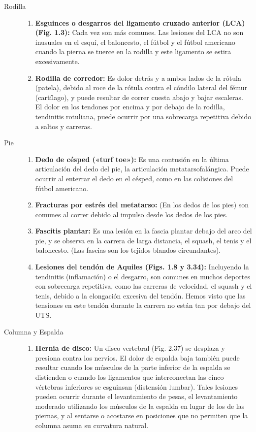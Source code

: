 \documentclass[12pt]{book}
\begin{document}
\begin{description}
  \item[Rodilla] \hfill
  \begin{enumerate}
    \item \textbf{Esguinces o desgarros del ligamento cruzado anterior (LCA) (Fig. 1.3):} Cada vez son más comunes. Las lesiones del LCA no son inusuales en el esquí, el baloncesto, el fútbol y el fútbol americano cuando la pierna se tuerce en la rodilla y este ligamento se estira excesivamente.
    \item \textbf{Rodilla de corredor:} Es dolor detrás y a ambos lados de la rótula (patela), debido al roce de la rótula contra el cóndilo lateral del fémur (cartílago), y puede resultar de correr cuesta abajo y bajar escaleras. El dolor en los tendones por encima y por debajo de la rodilla, tendinitis rotuliana, puede ocurrir por una sobrecarga repetitiva debido a saltos y carreras.
  \end{enumerate}

  \item[Pie] \hfill
  \begin{enumerate}
    \item \textbf{Dedo de césped («turf toe»):} Es una contusión en la última articulación del dedo del pie, la articulación metatarsofalángica. Puede ocurrir al enterrar el dedo en el césped, como en las colisiones del fútbol americano.
    \item \textbf{Fracturas por estrés del metatarso:} (En los dedos de los pies) son comunes al correr debido al impulso desde los dedos de los pies.
    \item \textbf{Fascitis plantar:} Es una lesión en la fascia plantar debajo del arco del pie, y se observa en la carrera de larga distancia, el squash, el tenis y el baloncesto. (Las fascias son los tejidos blandos circundantes).
    \item \textbf{Lesiones del tendón de Aquiles (Figs. 1.8 y 3.34):} Incluyendo la tendinitis (inflamación) o el desgarro, son comunes en muchos deportes con sobrecarga repetitiva, como las carreras de velocidad, el squash y el tenis, debido a la elongación excesiva del tendón. Hemos visto que las tensiones en este tendón durante la carrera no están tan por debajo del $\text{UTS}$.
  \end{enumerate}

  \item[Columna y Espalda] \hfill
  \begin{enumerate}
    \item \textbf{Hernia de disco:} Un disco vertebral (Fig. 2.37) se desplaza y presiona contra los nervios. El dolor de espalda baja también puede resultar cuando los músculos de la parte inferior de la espalda se distienden o cuando los ligamentos que interconectan las cinco vértebras inferiores se esguinsan (distensión lumbar). Tales lesiones pueden ocurrir durante el levantamiento de pesas, el levantamiento moderado utilizando los músculos de la espalda en lugar de los de las piernas, y al sentarse o acostarse en posiciones que no permiten que la columna asuma su curvatura natural.
  \end{enumerate}


\end{description}
\end{document}
